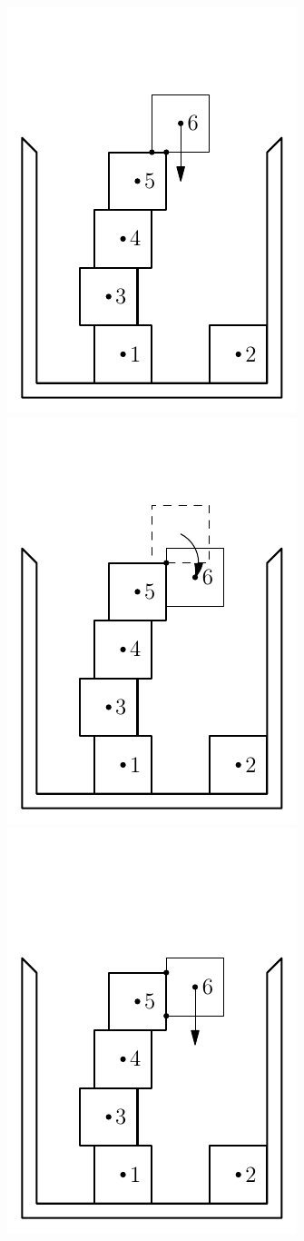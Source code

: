 \documentclass[12pt, sumlimits, intlimits]{article}
\begin{document}
\begin{figure}
\includegraphics[width=\w]{btr-4}%
\includegraphics[width=\w]{btr-5}%
\includegraphics[width=\w]{btr-6}%

\end{figure}
\end{document}
